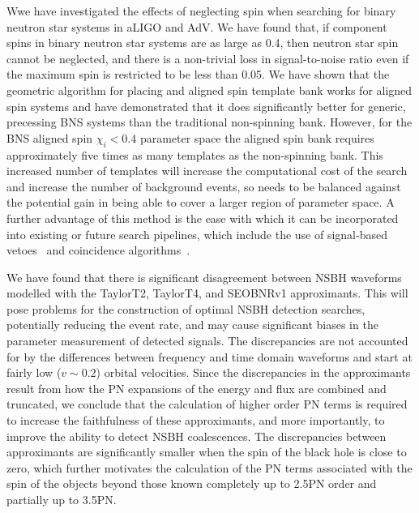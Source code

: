 Wwe have investigated the effects of neglecting spin when
searching for binary neutron star systems in aLIGO and AdV. We have found
that, if component spins in binary neutron star systems are as large as 0.4,
then neutron star spin cannot be neglected, and there is a non-trivial loss in
signal-to-noise ratio even if the maximum spin is restricted to be less than
0.05. We have shown that the geometric algorithm for placing and
aligned spin template bank works for
aligned spin systems and have demonstrated that it does significantly better
for generic, precessing BNS systems than the traditional non-spinning bank.
However, for the BNS aligned spin $\chi_i < 0.4$ parameter space the aligned
spin bank requires approximately five times as many templates as the
non-spinning bank. This increased number of templates will increase the
computational cost of the search and increase the number of background events,
so needs to be balanced against the potential gain in being able to cover a
larger region of parameter space. A further advantage of this method is the ease
with which it can be incorporated into existing or future search
pipelines, which include the use of signal-based vetoes~\cite{Allen:2004gu}
and coincidence algorithms~\cite{Robinson:2008}.

We have found that there is significant disagreement between \ac{NSBH}
waveforms modelled with the TaylorT2, TaylorT4, and SEOBNRv1 approximants. 
This will pose problems for the construction of optimal NSBH detection searches, 
potentially reducing the event rate, 
and may cause significant biases in the parameter measurement of detected signals.
The discrepancies are not accounted for by the differences between
frequency and time domain waveforms and start at fairly low ($v \sim 0.2$) orbital velocities.
Since the discrepancies in the approximants result from how the \ac{PN} expansions of the energy and flux
are combined and truncated, we conclude
that the calculation of higher order \ac{PN} terms is required to increase the
faithfulness of these approximants, and more importantly, to improve the
ability to detect \ac{NSBH} coalescences. The
discrepancies between approximants are significantly smaller when the spin of
the black hole is close to zero, which further motivates the calculation of the
\ac{PN} terms associated with the spin of the objects beyond those known
completely up to 2.5\ac{PN} order and partially up to 3.5\ac{PN}.

